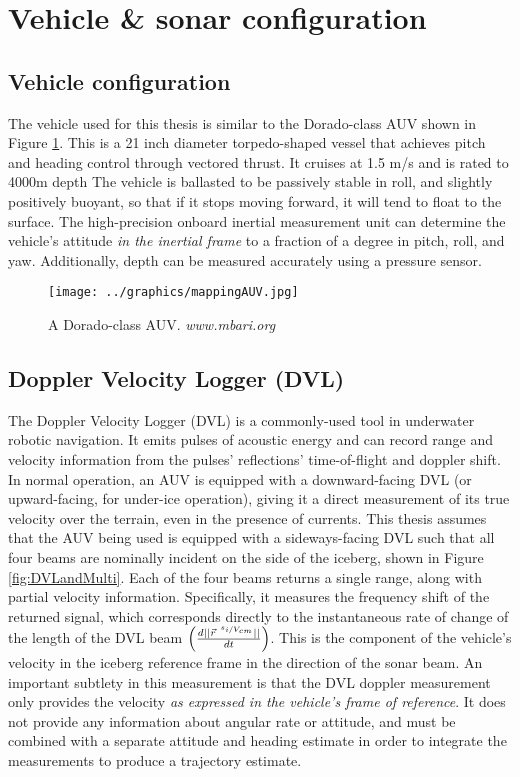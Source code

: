 \section{Vehicle \& sonar configuration}
\label{sec.VehicleSetup}

\subsection{Vehicle configuration}
The vehicle used for this thesis is similar to the Dorado-class AUV shown in Figure \ref{fig:AUVdorado}. This is a 21 inch diameter torpedo-shaped vessel that achieves pitch and heading control through vectored thrust. It cruises at 1.5 m/s and is rated to 4000m depth The vehicle is ballasted to be passively stable in roll, and slightly positively buoyant, so that if it stops moving forward, it will tend to float to the surface. The high-precision onboard inertial measurement unit can determine the vehicle's attitude \emph{in the inertial frame} to a fraction of a degree in pitch, roll, and yaw. Additionally, depth can be measured accurately using a pressure sensor. 

\begin{figure}[htb]
   \centering
   \texttt{[image: ../graphics/mappingAUV.jpg]} %
   \caption{A Dorado-class AUV. \emph{www.mbari.org}}
   \label{fig:AUVdorado}
\end{figure}



\subsection{Doppler Velocity Logger (DVL)}

The Doppler Velocity Logger (DVL) is a commonly-used tool in underwater robotic navigation. It emits pulses of acoustic energy and can record range and velocity information from the pulses' reflections' time-of-flight and doppler shift. In normal operation, an AUV is equipped with a downward-facing DVL (or upward-facing, for under-ice operation), giving it a direct measurement of its true velocity over the terrain, even in the presence of currents. This thesis assumes that the AUV being used is equipped with a sideways-facing DVL such that all four beams are nominally incident on the side of the iceberg, shown in Figure \ref{fig:DVLandMulti}. Each of the four beams returns a single range, along with partial velocity information. Specifically, it measures the frequency shift of the returned signal, which corresponds directly to the instantaneous rate of change of the length of the DVL beam $\left( \frac{d||\vec{r}^{~\nicefrac{s_i}{V_{cm}}}||}{dt}\right)$. This is the component of the vehicle's velocity in the iceberg reference frame in the direction of the sonar beam. An important subtlety in this measurement is that the DVL doppler measurement only provides the velocity \emph{as expressed in the vehicle's frame of reference}. It does not provide any information about angular rate or attitude, and must be combined with a separate attitude and heading estimate in order to integrate the measurements to produce a trajectory estimate. 

